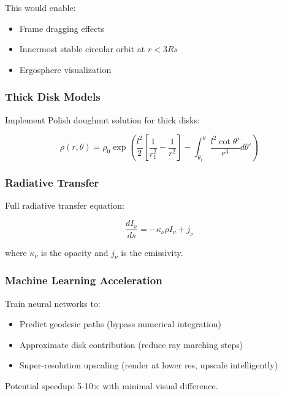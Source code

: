 \documentclass[12pt,a4paper]{article}
\theoremstyle{definition}
\theoremstyle{remark}
\begin{document}
This would enable:
\begin{itemize}
    \item Frame dragging effects
    \item Innermost stable circular orbit at $r < 3Rs$
    \item Ergosphere visualization
\end{itemize}

\subsubsection{Thick Disk Models}

Implement Polish doughnut solution for thick disks:

\begin{equation}
    \rho(r, \theta) = \rho_0 \exp\left(\frac{l^2}{2}\left[\frac{1}{r_1^2} - \frac{1}{r^2}\right] - \int_{\theta_1}^{\theta}\frac{l^2\cot\theta'}{r^3}d\theta'\right)
\end{equation}

\subsubsection{Radiative Transfer}

Full radiative transfer equation:

\begin{equation}
    \frac{dI_\nu}{ds} = -\kappa_\nu \rho I_\nu + j_\nu
\end{equation}

where $\kappa_\nu$ is the opacity and $j_\nu$ is the emissivity.

\subsubsection{Machine Learning Acceleration}

Train neural networks to:
\begin{itemize}
    \item Predict geodesic paths (bypass numerical integration)
    \item Approximate disk contribution (reduce ray marching steps)
    \item Super-resolution upscaling (render at lower res, upscale intelligently)
\end{itemize}

Potential speedup: 5-10× with minimal visual difference.

\end{document}
